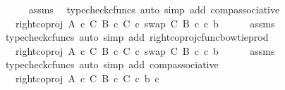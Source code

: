\begin{isabellebody}
\ \ \ \ \isamarkupfalse%
\ assms\ \isamarkupfalse%
\ {\isacharparenleft}{\kern0pt}typecheck{\isacharunderscore}{\kern0pt}cfuncs{\isacharcomma}{\kern0pt}\ auto\ simp\ add{\isacharcolon}{\kern0pt}\ comp{\isacharunderscore}{\kern0pt}associative{}{\isacharparenright}{\kern0pt}\isanewline
\ \ \isamarkupfalse%
\ \isamarkupfalse%
\ {\isachardoublequoteopen}{\isachardot}{\kern0pt}{\isachardot}{\kern0pt}{\isachardot}{\kern0pt}\ {\isacharequal}{\kern0pt}\ {\isacharparenleft}{\kern0pt}right{\isacharunderscore}{\kern0pt}coproj\ {\isacharparenleft}{\kern0pt}A\ {\isasymtimes}\isactrlsub c\ C{\isacharparenright}{\kern0pt}\ {\isacharparenleft}{\kern0pt}B\ {\isasymtimes}\isactrlsub c\ C{\isacharparenright}{\kern0pt}\ {\isasymcirc}\isactrlsub c\ swap\ C\ B{\isacharparenright}{\kern0pt}\ {\isasymcirc}\isactrlsub c\ {\isasymlangle}c{\isacharcomma}{\kern0pt}\ b{\isasymrangle}{\isachardoublequoteclose}\isanewline
\ \ \ \ \isamarkupfalse%
\ assms\ \isamarkupfalse%
\ {\isacharparenleft}{\kern0pt}typecheck{\isacharunderscore}{\kern0pt}cfuncs{\isacharcomma}{\kern0pt}\ auto\ simp\ add{\isacharcolon}{\kern0pt}\ right{\isacharunderscore}{\kern0pt}coproj{\isacharunderscore}{\kern0pt}cfunc{\isacharunderscore}{\kern0pt}bowtie{\isacharunderscore}{\kern0pt}prod{\isacharparenright}{\kern0pt}\isanewline
\ \ \isamarkupfalse%
\ \isamarkupfalse%
\ {\isachardoublequoteopen}{\isachardot}{\kern0pt}{\isachardot}{\kern0pt}{\isachardot}{\kern0pt}\ {\isacharequal}{\kern0pt}\ right{\isacharunderscore}{\kern0pt}coproj\ {\isacharparenleft}{\kern0pt}A\ {\isasymtimes}\isactrlsub c\ C{\isacharparenright}{\kern0pt}\ {\isacharparenleft}{\kern0pt}B\ {\isasymtimes}\isactrlsub c\ C{\isacharparenright}{\kern0pt}\ {\isasymcirc}\isactrlsub c\ swap\ C\ B\ {\isasymcirc}\isactrlsub c\ {\isasymlangle}c{\isacharcomma}{\kern0pt}\ b{\isasymrangle}{\isachardoublequoteclose}\isanewline
\ \ \ \ \isamarkupfalse%
\ assms\ \isamarkupfalse%
\ {\isacharparenleft}{\kern0pt}typecheck{\isacharunderscore}{\kern0pt}cfuncs{\isacharcomma}{\kern0pt}\ auto\ simp\ add{\isacharcolon}{\kern0pt}\ comp{\isacharunderscore}{\kern0pt}associative{}{\isacharparenright}{\kern0pt}\isanewline
\ \ \isamarkupfalse%
\ \isamarkupfalse%
\ {\isachardoublequoteopen}{\isachardot}{\kern0pt}{\isachardot}{\kern0pt}{\isachardot}{\kern0pt}\ {\isacharequal}{\kern0pt}\ right{\isacharunderscore}{\kern0pt}coproj\ {\isacharparenleft}{\kern0pt}A\ {\isasymtimes}\isactrlsub c\ C{\isacharparenright}{\kern0pt}\ {\isacharparenleft}{\kern0pt}B\ {\isasymtimes}\isactrlsub c\ C{\isacharparenright}{\kern0pt}\ {\isasymcirc}\isactrlsub c\ {\isasymlangle}b{\isacharcomma}{\kern0pt}\ c{\isasymrangle}{\isachardoublequoteclose}\isanewline

\end{isabellebody}
